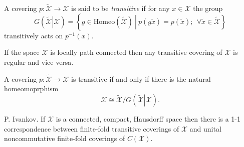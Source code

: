\documentclass{beamer}
\theoremstyle{plain}
\begin{document}
\begin{frame}

\begin{definition}
	A covering $ p:\widetilde{\mathcal  X}\to \mathcal  X$ is said to be \textit{transitive} if for any $x \in \mathcal  X$ the group
	$$
	G\left(\left.\widetilde{\mathcal  X} \right|\mathcal  X\right)= \left\{ \left.g \in \text{Homeo}\left(\widetilde{\mathcal X} \right)~\right|~ p(g\widetilde{x}) = p(\widetilde{x});~~\forall \widetilde{x} \in \widetilde{\mathcal  X}\right\} 
	$$
	transitively acts on $p^{-1}\left(x\right)$.
\end{definition}
\begin{fact}
	If the space $ \mathcal  X$ is locally path connected then any transitive covering  of $ \mathcal  X$  is regular and vice versa.
\end{fact}
\begin{fact}
	A covering $ p:\widetilde{\mathcal  X}\to \mathcal  X$ is {transitive} if and only if there is the natural homeomoprphism
	$$
\mathcal  X \cong \widetilde{\mathcal  X}/		G\left(\left.\widetilde{\mathcal  X} \right|\mathcal  X\right).
	$$
	
\end{fact}
\end{frame}
\begin{frame}
\begin{lemma}
	\alert{P. Ivankov}.
	If $\mathcal  X$ is a connected, compact, Hausdorff space then there is a 1-1 correspondence between finite-fold transitive coverings of $\mathcal  X$ and unital noncommutative finite-fold  coverings of $C\left(\mathcal  X\right)$.
\end{lemma}
\end{frame}
\end{document}
